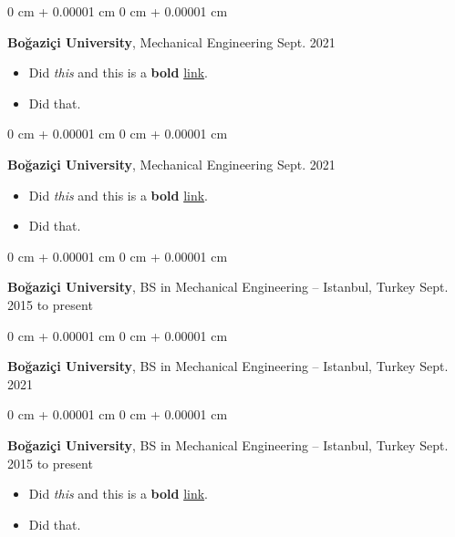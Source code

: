 \documentclass[10pt, letterpaper]{article}
\newenvironment{highlights}{
    \begin{itemize}[
        topsep=0.10 cm,
        parsep=0.10 cm,
        partopsep=0pt,
        itemsep=0pt,
        leftmargin=0 cm + 10pt
    ]
}{
    \end{itemize}
        
    \vspace{-0.20cm}
} %
\newenvironment{onecolentry}{
    \begin{adjustwidth}{
        0 cm + 0.00001 cm
    }{
        0 cm + 0.00001 cm
    }
}{
    \end{adjustwidth}
} %
\begin{document}
        \vspace{0.1 cm}

        \begin{onecolentry}
            \textbf{Boğaziçi University}, Mechanical Engineering \hfill Sept. 2021
            \begin{highlights}
                \item Did \textit{this} and this is a \textbf{bold} \href{https://example.com}{link}.
                \item Did that.
            \end{highlights}
        \end{onecolentry}

        \vspace{0.1 cm}

        \begin{onecolentry}
            \textbf{Boğaziçi University}, Mechanical Engineering \hfill Sept. 2021
            \begin{highlights}
                \item Did \textit{this} and this is a \textbf{bold} \href{https://example.com}{link}.
                \item Did that.
            \end{highlights}
        \end{onecolentry}

        \vspace{0.1 cm}

        \begin{onecolentry}
            \textbf{Boğaziçi University}, BS in Mechanical Engineering -- Istanbul, Turkey \hfill Sept. 2015 to present
        \end{onecolentry}

        \vspace{0.1 cm}

        \begin{onecolentry}
            \textbf{Boğaziçi University}, BS in Mechanical Engineering -- Istanbul, Turkey \hfill Sept. 2021
        \end{onecolentry}

        \vspace{0.1 cm}

        \begin{onecolentry}
            \textbf{Boğaziçi University}, BS in Mechanical Engineering -- Istanbul, Turkey \hfill Sept. 2015 to present
            \begin{highlights}
                \item Did \textit{this} and this is a \textbf{bold} \href{https://example.com}{link}.
                \item Did that.
            \end{highlights}
        \end{onecolentry}
\end{document}
